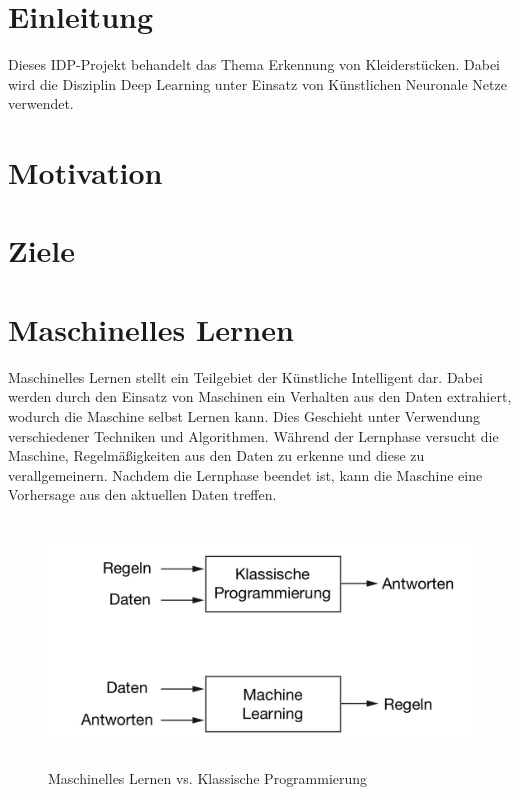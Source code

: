 \documentclass[12pt,titlepage]{article}
\begin{document}
\newpage
\tableofcontents
\newpage

\section{Einleitung}

Dieses IDP-Projekt behandelt das Thema Erkennung von Kleiderstücken. Dabei wird die Disziplin Deep Learning unter Einsatz von Künstlichen Neuronale Netze verwendet.

\section{Motivation}

\section{Ziele}

\section{Maschinelles Lernen}

Maschinelles Lernen stellt ein Teilgebiet der Künstliche Intelligent dar. Dabei werden durch den Einsatz von Maschinen ein Verhalten aus den Daten extrahiert, wodurch die Maschine selbst Lernen kann. Dies Geschieht unter Verwendung verschiedener Techniken und Algorithmen. Während der Lernphase versucht die Maschine, Regelmäßigkeiten aus den Daten zu erkenne und diese zu verallgemeinern. Nachdem die Lernphase beendet ist, kann die Maschine eine Vorhersage aus den aktuellen Daten treffen.

\begin{figure}[ht]
	\centering
  \includegraphics[width=15cm, height=6.5cm]{Abbildung_MaschinellesLernen_1.jpg}
	\caption{Maschinelles Lernen vs. Klassische Programmierung}
	\label{fig1}
\end{figure}
\end{document}
